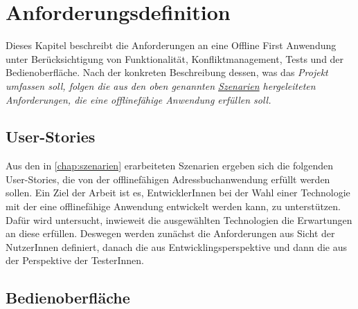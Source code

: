 \chapter{\label{chap:anforderungen}Anforderungsdefinition}
Dieses Kapitel beschreibt die Anforderungen an eine Offline First Anwendung unter Berücksichtigung von Funktionalität, Konfliktmanagement, Tests und der Bedienoberfläche.
Nach der konkreten Beschreibung dessen, was das \it{Projekt} umfassen soll, folgen die aus den oben genannten \hyperref[chap:szenarien]{Szenarien} hergeleiteten Anforderungen, die eine offlinefähige Anwendung erfüllen soll.
%
%

%
%

%
%
\section{User-Stories}
Aus den in \autoref{chap:szenarien} erarbeiteten Szenarien ergeben sich die folgenden User-Stories, die von der offlinefähigen Adressbuchanwendung erfüllt werden sollen.
Ein Ziel der Arbeit ist es, EntwicklerInnen bei der Wahl einer Technologie mit der eine offlinefähige Anwendung entwickelt werden kann, zu unterstützen. Dafür wird untersucht, inwieweit die ausgewählten Technologien die Erwartungen an diese erfüllen.
Deswegen werden zunächst die Anforderungen aus Sicht der NutzerInnen definiert, danach die aus Entwicklingsperspektive und dann die aus der Perspektive der TesterInnen.



%
%
\section{Bedienoberfläche}
